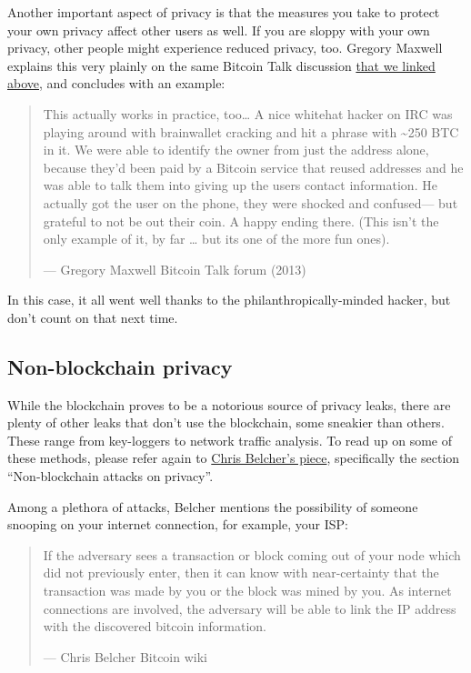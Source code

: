 Another important aspect of privacy is that the measures you take to
protect your own privacy affect other users as well. If you are sloppy
with your own privacy, other people might experience reduced privacy,
too. Gregory Maxwell explains this very plainly on the same Bitcoin Talk
discussion
\href{https://bitcointalk.org/index.php?topic=334316.msg3589252\#msg3589252}{that
we linked above}, and concludes with an example:

\begin{quote}
This actually works in practice, too\ldots\hspace{0pt} A nice whitehat
hacker on IRC was playing around with brainwallet cracking and hit a
phrase with \textasciitilde250 BTC in it. We were able to identify the
owner from just the address alone, because they'd been paid by a Bitcoin
service that reused addresses and he was able to talk them into giving
up the users contact information. He actually got the user on the phone,
they were shocked and confused--- but grateful to not be out their coin.
A happy ending there. (This isn't the only example of it, by far
\ldots\hspace{0pt} but its one of the more fun ones).

---  Gregory Maxwell Bitcoin Talk forum (2013)
\end{quote}

In this case, it all went well thanks to the philanthropically-minded
hacker, but don't count on that next time.

\hypertarget{nonblockchainprivacy}{%
\subsection{Non-blockchain privacy}\label{nonblockchainprivacy}}

While the blockchain proves to be a notorious source of privacy leaks,
there are plenty of other leaks that don't use the blockchain, some
sneakier than others. These range from key-loggers to network traffic
analysis. To read up on some of these methods, please refer again to
\href{https://en.bitcoin.it/Privacy\#Non-blockchain_attacks_on_privacy}{Chris
Belcher's piece}, specifically the section ``Non-blockchain attacks on
privacy''.

Among a plethora of attacks, Belcher mentions the possibility of someone
snooping on your internet connection, for example, your ISP:

\begin{quote}
If the adversary sees a transaction or block coming out of your node
which did not previously enter, then it can know with near-certainty
that the transaction was made by you or the block was mined by you. As
internet connections are involved, the adversary will be able to link
the IP address with the discovered bitcoin information.

---  Chris Belcher Bitcoin wiki
\end{quote}

